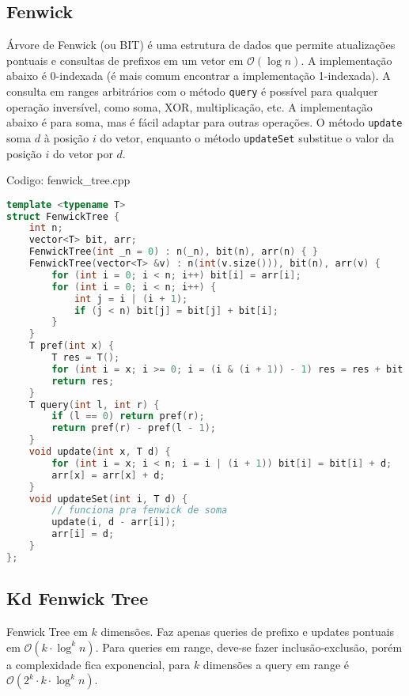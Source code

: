 \documentclass[10pt, a4paper, oneside]{book}
\begin{document}
\subsection{Fenwick}


Árvore de Fenwick (ou BIT) é uma estrutura de dados que permite atualizações pontuais e consultas de prefixos em um vetor em $\mathcal{O}(\log n)$. A implementação abaixo é 0-indexada (é mais comum encontrar a implementação 1-indexada). A consulta em ranges arbitrários com o método \texttt{query} é possível para qualquer operação inversível, como soma, XOR, multiplicação, etc. A implementação abaixo é para soma, mas é fácil adaptar para outras operações. O método \texttt{update} soma $d$ à posição $i$ do vetor, enquanto o método \texttt{updateSet} substitue o valor da posição $i$ do vetor por $d$.

\hfill

Codigo: fenwick\_tree.cpp

\begin{lstlisting}[language=C++]
template <typename T>
struct FenwickTree {
    int n;
    vector<T> bit, arr;
    FenwickTree(int _n = 0) : n(_n), bit(n), arr(n) { }
    FenwickTree(vector<T> &v) : n(int(v.size())), bit(n), arr(v) {
        for (int i = 0; i < n; i++) bit[i] = arr[i];
        for (int i = 0; i < n; i++) {
            int j = i | (i + 1);
            if (j < n) bit[j] = bit[j] + bit[i];
        }
    }
    T pref(int x) {
        T res = T();
        for (int i = x; i >= 0; i = (i & (i + 1)) - 1) res = res + bit[i];
        return res;
    }
    T query(int l, int r) {
        if (l == 0) return pref(r);
        return pref(r) - pref(l - 1);
    }
    void update(int x, T d) {
        for (int i = x; i < n; i = i | (i + 1)) bit[i] = bit[i] + d;
        arr[x] = arr[x] + d;
    }
    void updateSet(int i, T d) {
        // funciona pra fenwick de soma
        update(i, d - arr[i]);
        arr[i] = d;
    }
};
\end{lstlisting}
\hfill

\subsection{Kd Fenwick Tree}


Fenwick Tree em $k$ dimensões. Faz apenas queries de prefixo e updates pontuais em $\mathcal{O}(k \cdot \log^k n)$. Para queries em range, deve-se fazer inclusão-exclusão, porém a complexidade fica exponencial, para $k$ dimensões a query em range é $\mathcal{O}(2^k \cdot k \cdot \log^k n)$.
\end{document}
